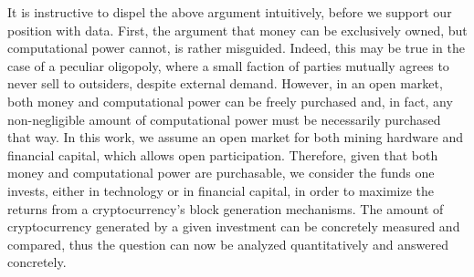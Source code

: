 It is instructive to dispel the above argument intuitively, before we support
our position with data. First, the argument that money can be exclusively
owned, but computational power cannot, is rather misguided. Indeed, this may be
true in the case of a peculiar oligopoly, where a small faction of parties
mutually agrees to never sell to outsiders, despite external demand. However,
in an open market, both money and computational power can be freely purchased
and, in fact, any non-negligible amount of computational power must be
necessarily purchased that way.  In this work, we assume an open market for
both mining hardware and financial capital, which allows open participation.
Therefore, given that both money and computational power are purchasable, we
consider the funds one invests, either in technology or in financial capital,
in order to maximize the returns from a cryptocurrency's block generation
mechanisms. The amount of cryptocurrency generated by a given investment can be
concretely measured and compared, thus the question can now be analyzed
quantitatively and answered concretely.
